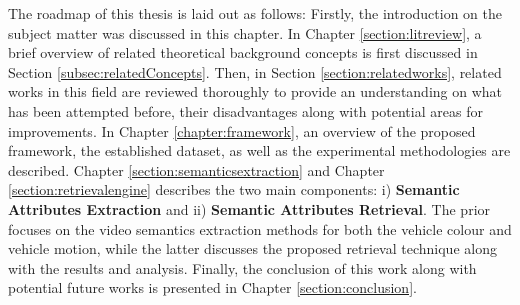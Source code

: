The roadmap of this thesis is laid out as follows: Firstly, the introduction on the subject matter was discussed in this chapter.
In Chapter \ref{section:litreview}, a brief overview of related theoretical background concepts is first discussed in Section \ref{subsec:relatedConcepts}. Then, in Section \ref{section:relatedworks}, related works in this field are reviewed thoroughly to provide an understanding on what has been attempted before, their disadvantages along with potential areas for improvements.
In Chapter \ref{chapter:framework}, an overview of the proposed framework, the established dataset, as well as the experimental methodologies are described.
Chapter \ref{section:semanticsextraction} and Chapter \ref{section:retrievalengine} describes the two main components: i) \textbf{Semantic Attributes Extraction} and ii) \textbf{Semantic Attributes Retrieval}. 
The prior focuses on the video semantics extraction methods for both the vehicle colour and vehicle motion, while the latter discusses the proposed retrieval technique along with the results and analysis.
Finally, the conclusion of this work along with potential future works is presented in Chapter \ref{section:conclusion}.